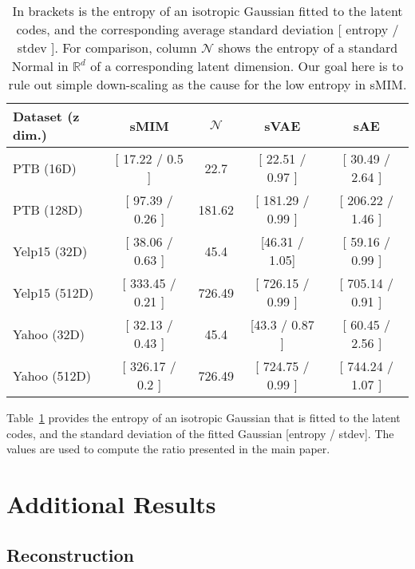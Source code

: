 \documentclass{article}
\newcommand{\bs}{\boldsymbol}
\newcommand{\z}{{\bs z}}
\begin{document}
\begin{table}[t]
    \centering
    \setlength{\tabcolsep}{0.2em} {\scriptsize
    \renewcommand{\arraystretch}{1.2}\begin{tabular}{l||cccc}
        Dataset ($\z$ dim.) & sMIM & $\mathcal{N}$ & sVAE & sAE   \\ \hline \hline
        PTB (16D) & [ 17.22 / 0.5 ] & 22.7 &  [ 22.51 / 0.97 ] &  [ 30.49 / 2.64 ]  \\
        PTB (128D) &  [ 97.39 / 0.26 ] & 181.62 & [ 181.29 / 0.99 ] & [ 206.22 / 1.46 ] \\
        \hline
        Yelp15 (32D) & [ 38.06 / 0.63 ] & 45.4 &  [46.31 / 1.05] & [ 59.16 / 0.99 ]  \\
        Yelp15 (512D) &  [ 333.45 / 0.21 ] & 726.49  & [ 726.15 / 0.99 ] & [ 705.14 / 0.91 ] \\
        \hline
        Yahoo (32D) &  [ 32.13 / 0.43 ] & 45.4 & [43.3 / 0.87 ] & [ 60.45 / 2.56 ]  \\
        Yahoo (512D) &  [ 326.17 / 0.2 ] & 726.49  &  [ 724.75 / 0.99 ] & [ 744.24 / 1.07 ] \\
        \end{tabular}
    }
    \vspace*{-0.1cm}
    \caption{
    In brackets is the entropy of an isotropic Gaussian fitted to the latent codes, and the corresponding average standard deviation [ entropy / stdev ].
    For comparison, column $\mathcal{N}$ shows the entropy of a standard Normal in $\mathbb{R}^{d}$ of a corresponding latent dimension.
    Our goal here is to rule out simple down-scaling as the cause for the low entropy in sMIM.
}
    \label{tab:language-modelling-quantitative-entropy-fitted}
    \vspace*{-0.1cm}
\end{table}

Table\ \ref{tab:language-modelling-quantitative-entropy-fitted} provides the entropy of an isotropic Gaussian that is fitted to the latent codes, and the standard deviation of the fitted Gaussian [entropy / stdev]. The values are used to compute the ratio presented in the main paper.

\FloatBarrier


\section{Additional Results}



\subsection{Reconstruction}
\end{document}
